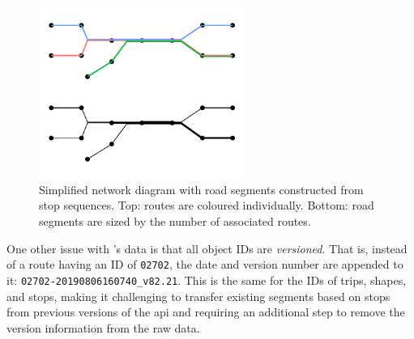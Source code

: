 \begin{knitrout}\small
{}\color{fgcolor}\begin{figure}

{\centering \includegraphics[width=0.6\textwidth]{figure/gtfs_route_network-1} 

}

\caption[Simplified network diagram with road segments constructed from stop sequences]{Simplified network diagram with road segments constructed from stop sequences. Top: routes are coloured individually. Bottom: road segments are sized by the number of associated routes.}\label{fig:gtfs_route_network}
\end{figure}


\end{knitrout}





One other issue with \AT{}'s \GTFS{} data is that all object IDs are \emph{versioned}. That is, instead of a route having an ID of \verb+02702+, the date and version number are appended to it: \verb+02702-20190806160740_v82.21+. This is the same for the IDs of trips, shapes, and stops, making it challenging to transfer existing segments based on stops from previous versions of the \gls{api} and requiring an additional step to remove the version information from the raw data.


